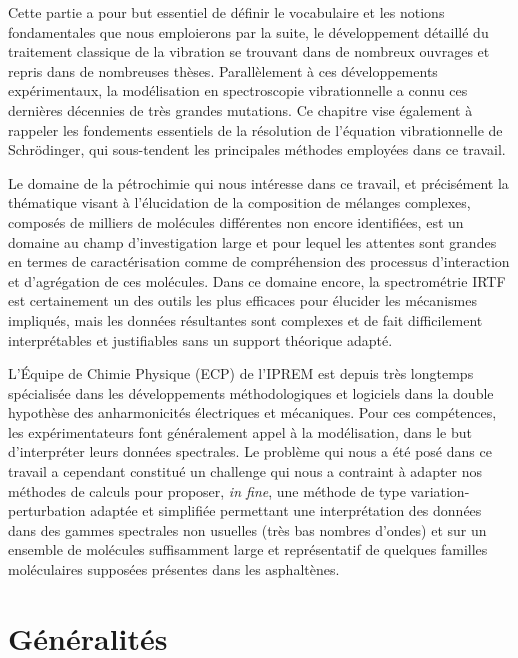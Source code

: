 Cette partie a pour but essentiel de définir le vocabulaire et les notions fondamentales que nous emploierons par la suite, le développement détaillé du traitement classique de la vibration se trouvant dans de nombreux ouvrages et repris dans de nombreuses thèses. Parallèlement à ces développements expérimentaux, la modélisation en spectroscopie vibrationnelle a connu ces dernières décennies de très grandes mutations. Ce chapitre vise également à rappeler les fondements essentiels de la résolution de l'équation vibrationnelle de Schr\"{o}dinger, qui sous-tendent les principales méthodes employées dans ce travail. 


Le domaine de la pétrochimie qui nous intéresse dans ce travail, et précisément la thématique visant à l'élucidation de la composition de mélanges complexes, composés de milliers de molécules différentes non encore identifiées, est un domaine au champ d'investigation large et pour lequel les attentes sont grandes en termes de caractérisation comme de compréhension des processus d’interaction et d’agrégation de ces molécules. Dans ce domaine encore, la spectrométrie IRTF est certainement un des outils les plus efficaces pour élucider les mécanismes impliqués, mais les données résultantes sont complexes et de fait difficilement interprétables et justifiables sans un support théorique adapté.

L'Équipe de Chimie Physique (ECP) de l'IPREM est depuis très longtemps spécialisée dans les développements méthodologiques et logiciels dans la double hypothèse des anharmonicités électriques et mécaniques. Pour ces compétences, les expérimentateurs font généralement appel à la modélisation, dans le but d'interpréter leurs données spectrales.
Le problème qui nous a été posé dans ce travail a cependant constitué un challenge qui nous a contraint à adapter nos méthodes de calculs pour proposer, \textit{in fine}, une méthode de type variation-perturbation adaptée et simplifiée permettant une interprétation des données dans des gammes spectrales non usuelles (très bas nombres d’ondes) et sur un ensemble de molécules suffisamment large et représentatif de quelques familles moléculaires supposées présentes dans les asphaltènes. 


\newpage

\section{Généralités}

